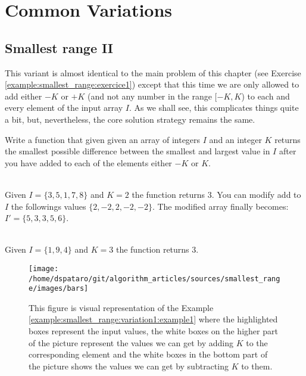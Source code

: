 \section{Common Variations}
\subsection{Smallest range \RN{2} } This variant is almost identical to the main problem of this
chapter (see Exercise \ref{example:smallest_range:exercice1}) except that this time we are only
allowed to add either $-K$ or $+K$ (and not any number in the range $[-K,K$) to each and every
element of the input array $I$. As we shall see, this complicates things quite a bit, but,
nevertheless, the core solution strategy remains the same. 

\begin{exercise}
	\label{example:smallest_range:variation1:exercice1}
	Write a function that given given an array of integers $I$ and an integer $K$ returns the
	smallest possible difference between the smallest and largest value in $I$ after you have added
	to each of the elements either $-K$ or $K$.
	
		\begin{example}
			\label{example:smallest_range:variation1:example1}
			\hfill \\
			Given $I = \{3,5,1,7,8\}$ and $K=2$ the function returns $3$. You can modify add to
			$I$ the followings values $\{2,-2,2,-2,-2\}$. The modified array finally becomes:
			$I'=\{5,3,3,5,6\}$. 
		\end{example}
	
		\begin{example}
			\label{example:smallest_range:variation1:example2}
			\hfill \\
			Given $I = \{1,9,4\}$ and $K=3$ the function returns $3$.
		\end{example}
	
	\end{exercise}

	\begin{figure}
		\centering
		\texttt{[image: /home/dspataro/git/algorithm\_articles/sources/smallest\_range/images/bars]}
		\caption{This figure is visual representation of the Example \ref{example:smallest_range:variation1:example1}
		where the highlighted boxes represent the input values, the white boxes on the higher part of
		the picture represent the values we can get by adding $K$ to the corresponding element and the
		white boxes in the bottom part of the picture shows the values we can get by subtracting $K$ to
		them.}
		\label{fig:smallest_range:bars_full}
	\end{figure}

